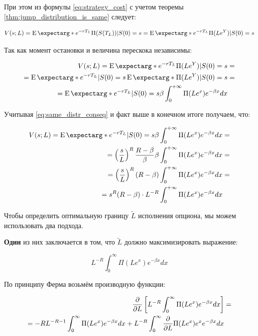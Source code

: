 \documentclass[a4paper,12pt]{article}
\theoremstyle{definition}
\newcommand{\expect}{\operatorname{E}\expectarg}
\begin{document}
При этом из формулы \eqref{eq:strategy_cost} с учетом теоремы \ref{thm:jump_distribution_is_same} следует:

\begin{equation*}
    V(s; L) = \expect*{e^{-rT_L} \Pi(S(T_L)) | S(0) = s} = \expect*{e^{-rT_L} \Pi(L e^Y) | S(0) = s}
\end{equation*}

Так как момент остановки и величина перескока независимы:

\begin{equation*}
\begin{split}
    V(s; L) = \expect*{e^{-rT_L} \Pi(L e^Y) | S(0) = s} &= \\
    = \expect*{e^{-rT_L} | S(0) = s} \expect*{\Pi(L e^Y) | S(0) = s} &= \\
    = \expect*{e^{-rT_L} | S(0) = s} \beta \int_{0}^{+\infty} \Pi(L e^x) e^{-\beta x} dx
\end{split}
\end{equation*}

Учитывая \eqref{eq:same_distr_conseq} и факт выше в конечном итоге получаем, что:

\begin{equation}\label{eq:strategy_price_m2}
\begin{split}
    V(s; L) = \expect*{e^{-rT_L} | S(0) = s} \beta \int_{0}^{+\infty} \Pi(L e^x) e^{-\beta x} dx &= \\
    = \left( \frac{s}{L} \right)^R \frac{R - \beta}{\beta} \beta \int_{0}^{+\infty} \Pi(L e^x) e^{-\beta x} dx &= \\
    = \left( \frac{s}{L} \right)^R (R - \beta) \int_{0}^{+\infty} \Pi(L e^x) e^{-\beta x} dx &= \\
    = s^R (R - \beta) \cdot L^{-R} \int_{0}^{+\infty} \Pi(L e^x) e^{-\beta x} dx
\end{split}
\end{equation}

Чтобы определить оптимальную границу $\tilde{L}$ исполнения опциона, мы можем использовать два подхода. 

\textbf{Один} из них заключается в том, что $\tilde{L}$ должно максимизировать выражение:

\begin{equation*}
L^{-R} \int_{0}^{\infty} \Pi(L e^{x}) e^{-\beta x} dx
\end{equation*}

По принципу Ферма возьмём производную функции:

\begin{equation*}
\begin{split}
    \frac{\partial}{\partial L} \left[ L^{-R} \int_{0}^{\infty} \Pi(L e^{x}) e^{-\beta x} dx \right] &=\\
    = -R L^{-R-1}  \int_{0}^{\infty} \Pi(L e^{x}) e^{-\beta x} dx + L^{-R} \int_{0}^{\infty} \pdv{}{L} \Pi(L e^{x}) e^{x} e^{-\beta x} dx
\end{split}
\end{equation*}
\end{document}
